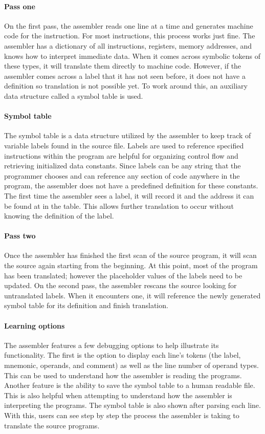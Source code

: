 \documentclass[man,hidelinks,floatsintext]{apa7}
\begin{document}
\paragraph{Pass one}
On the first pass, the assembler reads one line at a time and generates machine code for the instruction. For most instructions, this process works just fine. The assembler has a dictionary of all instructions, registers, memory addresses, and knows how to interpret immediate data. When it comes across symbolic tokens of these types, it will translate them directly to machine code. However, if the assembler comes across a label that it has not seen before, it does not have a definition so translation is not possible yet. To work around this, an auxiliary data structure called a symbol table is used.
\paragraph{Symbol table}
The symbol table is a data structure utilized by the assembler to keep track of variable labels found in the source file. Labels are used to reference specified instructions within the program are helpful for organizing control flow and retrieving initialized data constants. Since labels can be any string that the programmer chooses and can reference any section of code anywhere in the program, the assembler does not have a predefined definition for these constants. The first time the assembler sees a label, it will record it and the address it can be found at in the table. This allows further translation to occur without knowing the definition of the label.
\paragraph{Pass two}
Once the assembler has finished the first scan of the source program, it will scan the source again starting from the beginning. At this point, most of the program has been translated; however the placeholder values of the labels need to be updated. On the second pass, the assembler rescans the source looking for untranslated labels. When it encounters one, it will reference the newly generated symbol table for its definition and finish translation.
\paragraph{Learning options}
The assembler features a few debugging options to help illustrate its functionality. The first is the option to display each line's tokens (the label, mnemonic, operands, and comment) as well as the line number of operand types. This can be used to understand how the assembler is reading the programs. Another feature is the ability to save the symbol table to a human readable file. This is also helpful when attempting to understand how the assembler is interpreting the programs. The symbol table is also shown after parsing each line. With this, users can see step by step the process the assembler is taking to translate the source programs.
\end{document}
